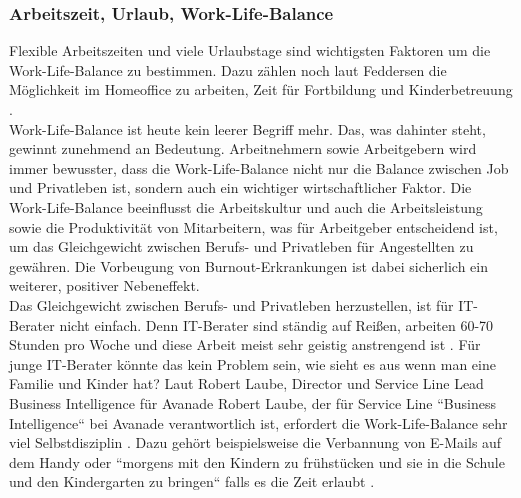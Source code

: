 \subsubsection{Arbeitszeit, Urlaub, Work-Life-Balance}
Flexible Arbeitszeiten und viele Urlaubstage sind wichtigsten Faktoren um die Work-Life-Balance zu bestimmen. Dazu zählen noch laut Feddersen die Möglichkeit im Homeoffice zu arbeiten, Zeit für Fortbildung und Kinderbetreuung \cite{WLB}.\\
Work-Life-Balance ist heute kein leerer Begriff mehr. Das, was dahinter steht, gewinnt zunehmend an Bedeutung. Arbeitnehmern sowie Arbeitgebern wird immer bewusster, dass die Work-Life-Balance nicht nur die Balance zwischen Job und Privatleben ist, sondern auch ein wichtiger wirtschaftlicher Faktor. Die Work-Life-Balance beeinflusst die Arbeitskultur und auch die Arbeitsleistung sowie die Produktivität von Mitarbeitern, was für Arbeitgeber entscheidend ist, um das Gleichgewicht zwischen Berufs- und Privatleben für Angestellten zu gewähren. Die Vorbeugung von Burnout-Erkrankungen ist dabei sicherlich ein weiterer, positiver Nebeneffekt. \cite{WLB} \\
Das Gleichgewicht zwischen Berufs- und Privatleben herzustellen, ist für IT-Berater nicht einfach. Denn IT-Berater sind ständig auf Reißen, arbeiten 60-70 Stunden pro Woche und diese Arbeit meist sehr geistig anstrengend ist \cite{WLBbeiIT-Berater}. Für junge IT-Berater könnte das kein Problem sein, wie sieht es aus wenn man eine Familie und Kinder hat? Laut Robert Laube, Director und Service Line Lead Business Intelligence für Avanade Robert Laube, der für Service Line ``Business Intelligence`` bei Avanade verantwortlich ist, erfordert die Work-Life-Balance sehr viel Selbstdisziplin \cite{WLBbeiIT-Berater}. Dazu gehört beispielsweise die Verbannung von E-Mails auf dem Handy oder ``morgens mit den Kindern zu frühstücken und sie in die Schule und den Kindergarten zu bringen`` falls es die Zeit erlaubt \cite{WLBbeiIT-Berater}.

